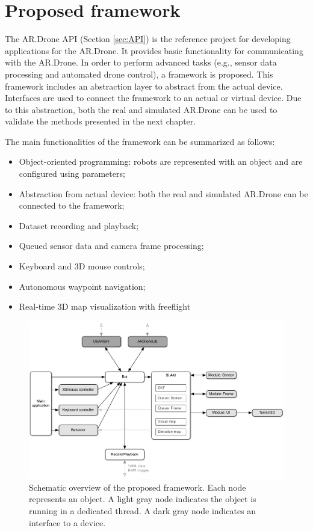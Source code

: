 \section{Proposed framework}
\label{sec:proposed-framework}
The AR.Drone API (Section \ref{sec:API}) is the reference project for developing applications for the AR.Drone.
It provides basic functionality for communicating with the AR.Drone.
In order to perform advanced tasks (e.g., sensor data processing and automated drone control), a framework is proposed.
This framework includes an abstraction layer to abstract from the actual device.
Interfaces are used to connect the framework to an actual or virtual device.
Due to this abstraction, both the real and simulated AR.Drone can be used to validate the methods presented in the next chapter.

The main functionalities of the framework can be summarized as follows:
\begin{itemize}
\item Object-oriented programming: robots are represented with an object and are configured using \mbox{parameters};
\item Abstraction from actual device: both the real and simulated AR.Drone can be connected to the framework;
\item Dataset recording and playback;
\item Queued sensor data and camera frame processing;
\item Keyboard and 3D mouse controls;
\item Autonomous waypoint navigation;
\item Real-time 3D map visualization with freeflight
\end{itemize}

\begin{figure}[htb!]
\centering
\includegraphics[width=\linewidth]{images/framework.pdf}
\caption{Schematic overview of the proposed framework. Each node represents an object. A light gray node indicates the object is running in a dedicated thread. A dark gray node indicates an interface to a device.} 
\label{fig:proposed_framework_schematic}
\end{figure}

